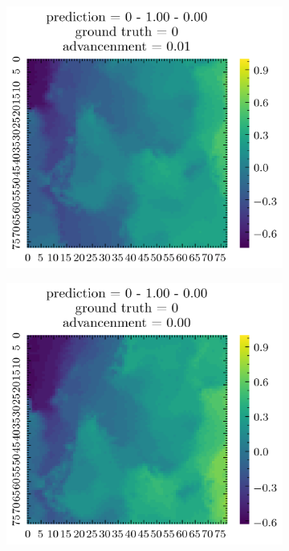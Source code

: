 \begin{figure}[H]
\begin{subfigure}[b]{0.19\textwidth}
    \end{subfigure}  
    \begin{subfigure}[b]{0.19\textwidth}
        \includegraphics[width=\linewidth]{../img/5/quarry/worst/patch-2d-2.png}
    \end{subfigure}
    \begin{subfigure}[b]{0.19\textwidth}
        \includegraphics[width=\linewidth]{../img/5/quarry/worst/patch-2d-3.png}

\end{subfigure}
\end{figure}
